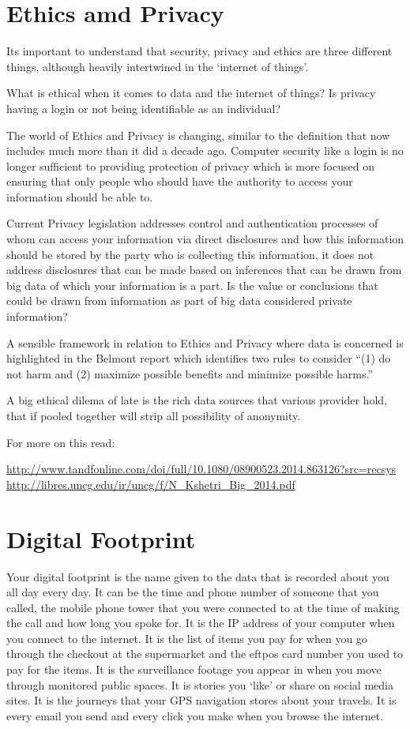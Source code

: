 \documentclass[]{book}
\theoremstyle{definition}
\theoremstyle{definition}
\theoremstyle{remark}
\begin{document}
\section{Ethics amd Privacy}\label{ethics-amd-privacy}

Its important to understand that security, privacy and ethics are three
different things, although heavily intertwined in the `internet of
things'.

What is ethical when it comes to data and the internet of things? Is
privacy having a login or not being identifiable as an individual?

The world of Ethics and Privacy is changing, similar to the definition
that now includes much more than it did a decade ago. Computer security
like a login is no longer sufficient to providing protection of privacy
which is more focused on ensuring that only people who should have the
authority to access your information should be able to.

Current Privacy legislation addresses control and authentication
processes of whom can access your information via direct disclosures and
how this information should be stored by the party who is collecting
this information, it does not address disclosures that can be made based
on inferences that can be drawn from big data of which your information
is a part. Is the value or conclusions that could be drawn from
information as part of big data considered private information?

A sensible framework in relation to Ethics and Privacy where data is
concerned is highlighted in the Belmont report which identifies two
rules to consider ``(1) do not harm and (2) maximize possible benefits
and minimize possible harms.''

A big ethical dilema of late is the rich data sources that various
provider hold, that if pooled together will strip all possibility of
anonymity.

For more on this read:

\url{http://www.tandfonline.com/doi/full/10.1080/08900523.2014.863126?src=recsys}
\url{http://libres.uncg.edu/ir/uncg/f/N_Kshetri_Big_2014.pdf}

\section{Digital Footprint}\label{digital-footprint}

Your digital footprint is the name given to the data that is recorded
about you all day every day. It can be the time and phone number of
someone that you called, the mobile phone tower that you were connected
to at the time of making the call and how long you spoke for. It is the
IP address of your computer when you connect to the internet. It is the
list of items you pay for when you go through the checkout at the
supermarket and the eftpos card number you used to pay for the items. It
is the surveillance footage you appear in when you move through
monitored public spaces. It is stories you `like' or share on social
media sites. It is the journeys that your GPS navigation stores about
your travels. It is every email you send and every click you make when
you browse the internet.
\end{document}
